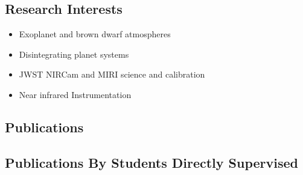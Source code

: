 \documentclass[11pt, oneside]{article}   	%
\begin{document}
\vspace{-0.2in}

\subsection*{Research Interests}
\begin{itemize}[noitemsep]
	\item Exoplanet and brown dwarf atmospheres
	\item Disintegrating planet systems
	\item JWST NIRCam and MIRI science and calibration
	\item Near infrared Instrumentation
\end{itemize}
\vspace{-0.2in}

\subsection*{Publications}

\nocite{glidic2022corot1}
\nocite{keles2022PEPSI_55cnc_e}
\nocite{su2022starSizedImpactClump}
\nocite{bruno2022starSpotCrossings}
\nocite{su2022satStarPhot}
\nocite{rieke2022IRAbsFlux1}
\nocite{schlawin2022baselineEclipseMapping}
\nocite{baka2021peeringThroughDebris}
\nocite{schlawin2021halphaV1298Tauc}
\nocite{herter2020triplespec4}
\nocite{schlawin2021LBTk2-22}
\nocite{schlawin2020jwstNoiseFloor2}
\nocite{schlawin2020jwstNoiseFloorI}
\nocite{mansfield2020eigenspectra}
\nocite{bean2018ers}
\nocite{schlawin2018kic1255Normal}
\nocite{schlawin2018JWSTforecasts}
\nocite{schlawin2014}
\nocite{schlawin2017dhs}
\nocite{schlawin2017bdVar}
\nocite{greene2017jatisNIRCam}
\nocite{greene2016slitlessGrisms}
\nocite{schlawin2016kic1255}
\nocite{santerne2016ogle2011BLG-0417}
\nocite{stevenson2016ers}
\nocite{schlawin2015PhDthesis}
\nocite{schlawin2010}
\nocite{schlawin2016kic1255}
\nocite{schlawin2014TSpec}
\nocite{muirheadKOI961}
\nocite{dale2009spitzerAnthology}
\nocite{west2011sloanMdwarf}
\nocite{muirhead2012}
\nocite{johnson2012}
\nocite{muirheadKOI961}
\nocite{muirhead2014coolKOIIV}

\begingroup
\renewcommand{\section}[2]{}%


\endgroup

\subsection*{Publications By Students Directly Supervised}
\end{document}
